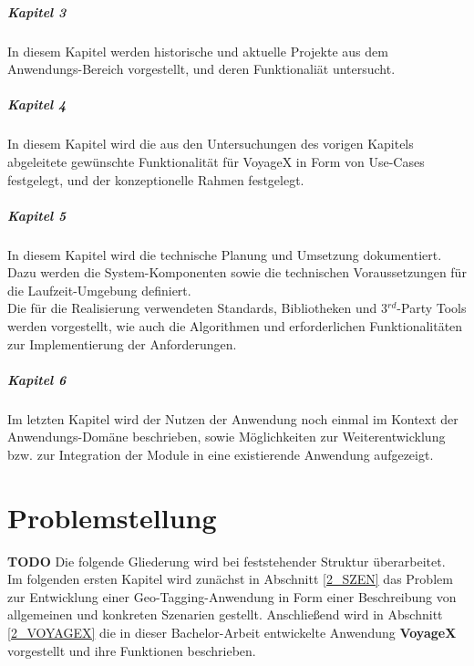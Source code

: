 \subparagraph{Kapitel 3}
In diesem Kapitel werden historische und aktuelle Projekte aus dem Anwendungs-Bereich vorgestellt, und
deren Funktionaliät untersucht.

\subparagraph{Kapitel 4}
In diesem Kapitel wird die aus den Untersuchungen des vorigen Kapitels abgeleitete gewünschte Funktionalität für VoyageX in Form von Use-Cases festgelegt, und der konzeptionelle Rahmen festgelegt.

\subparagraph{Kapitel 5}
In diesem Kapitel wird die technische Planung und Umsetzung dokumentiert. Dazu werden die System-Komponenten  sowie die technischen Voraussetzungen für die Laufzeit-Umgebung definiert.\\
Die für die Realisierung verwendeten Standards, Bibliotheken und 3$^{rd}$-Party Tools werden vorgestellt, wie auch die Algorithmen und erforderlichen Funktionalitäten zur Implementierung der Anforderungen.

\subparagraph{Kapitel 6}
Im letzten Kapitel wird der Nutzen der Anwendung noch einmal im Kontext der Anwendungs-Domäne beschrieben, sowie Möglichkeiten zur Weiterentwicklung bzw. zur Integration der Module in eine existierende Anwendung aufgezeigt.



\newpage
%
%
\section{Problemstellung}

\textbf{TODO} Die folgende Gliederung wird bei feststehender Struktur überarbeitet.\\
\noindent
Im folgenden ersten Kapitel wird zunächst in Abschnitt \ref{2_SZEN} das Problem zur Entwicklung einer Geo-Tagging-Anwendung in Form einer Beschreibung von allgemeinen und konkreten Szenarien gestellt. Anschließend wird in Abschnitt \ref{2_VOYAGEX} die in dieser Bachelor-Arbeit entwickelte Anwendung \textbf{VoyageX} vorgestellt und ihre Funktionen beschrieben.


